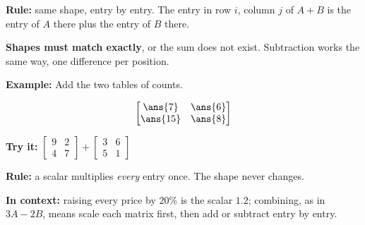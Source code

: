 \documentclass[12pt]{article}
\begin{document}


\begin{formulabox}
\textbf{Rule:} same shape, entry by entry. The entry in row $i$, column $j$ of $A + B$ is the entry of $A$ there plus the entry of $B$ there.\par
\textbf{Shapes must match exactly}, or the sum does not exist. Subtraction works the same way, one difference per position.
\end{formulabox}

\begin{examplebox}
\textbf{Example:} \quad Add the two tables of counts.

\[ \begin{bmatrix} \ans{7} & \ans{6} \\ \ans{15} & \ans{8} \end{bmatrix} \]
\end{examplebox}

\begin{tryitbox}
\textbf{Try it:} \quad $\begin{bmatrix} 9 & 2 \\ 4 & 7 \end{bmatrix} + \begin{bmatrix} 3 & 6 \\ 5 & 1 \end{bmatrix}$\\[2pt]
\end{tryitbox}


\begin{formulabox}
\textbf{Rule:} a scalar multiplies \emph{every} entry once. The shape never changes.\par
\textbf{In context:} raising every price by $20\%$ is the scalar $1.2$; combining, as in $3A - 2B$, means scale each matrix first, then add or subtract entry by entry.
\end{formulabox}
\end{document}
